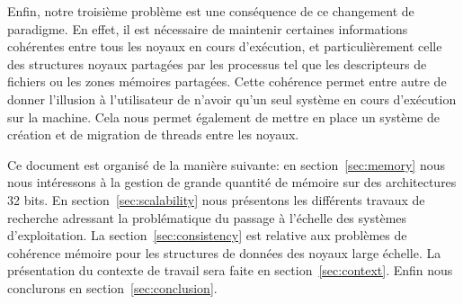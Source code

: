   Enfin, notre troisième problème est une conséquence de ce changement de
  paradigme. En effet, il est nécessaire de maintenir certaines informations
  cohérentes entre tous les noyaux en cours d'exécution, et particulièrement
  celle des structures noyaux partagées par les processus tel que les
  descripteurs de fichiers ou les zones mémoires partagées. Cette cohérence
  permet entre autre de donner l'illusion à l'utilisateur de n'avoir qu'un seul
  système en cours d'exécution sur la machine. Cela nous permet également de
  mettre en place un système de création et de migration de threads entre les
  noyaux.\newline

  \hspace{1cm}Ce document est organisé de la manière suivante: en
  section~\ref{sec:memory} nous nous intéressons à la gestion de grande quantité
  de mémoire sur des architectures 32 bits. En section~\ref{sec:scalability}
  nous présentons les différents travaux de recherche adressant la problématique
  du passage à l'échelle des systèmes d'exploitation.  La
  section~\ref{sec:consistency} est relative aux problèmes de cohérence mémoire
  pour les structures de données des noyaux large échelle. La présentation du
  contexte de travail sera faite en section~\ref{sec:context}. Enfin nous
  conclurons en section~\ref{sec:conclusion}.\newline
